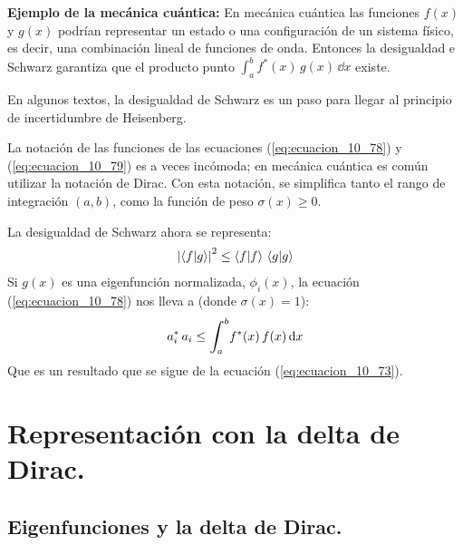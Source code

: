 \documentclass[12pt]{article}
\def\scaleint#1{\vcenter{\hbox{\scaleto[3ex]{\displaystyle\int}{#1}}}}
\def\bs{\mkern-12mu}
\numberwithin{equation}{section}
\begin{document}
\textbf{Ejemplo de la mecánica cuántica: } En mecánica cuántica las funciones $f (x)$ y $g (x)$ podrían representar un estado o una configuración de un sistema físico, es decir, una combinación lineal de funciones de onda. Entonces la desigualdad e Schwarz garantiza que el producto punto $\displaystyle \int_{a}^{b} f^{*} (x) \, g(x) \, \dd{x}$ existe.
\par
En algunos textos, la desigualdad de Schwarz es un paso para llegar al principio de incertidumbre de Heisenberg.
\par
La notación de las funciones de las ecuaciones (\ref{eq:ecuacion_10_78}) y (\ref{eq:ecuacion_10_79}) es a veces incómoda;  en mecánica cuántica es común utilizar la notación de Dirac. Con esta notación, se simplifica tanto el rango de integración $(a, b)$, como la función de peso $\sigma (x) \geq 0$. 
\par
La desigualdad de Schwarz ahora se representa:
\begin{align}
\abs{\braket{f}{g}}^{2} \leq \braket{f}{f} \, \braket{g}{g}
\label{eq:ecuacion_10_78a}
\end{align}
Si $g (x)$ es una eigenfunción normalizada, $\phi_{i} (x)$, la ecuación (\ref{eq:ecuacion_10_78}) nos lleva a (donde $\sigma (x) = 1$):
\begin{align}
a_{i}^{*} \, a_{i} \leq \scaleint{6ex}_{\bs a}^{b} f^{*} (x) \, f (x) \dd{x} 
\label{eq:ecuacion_10_81}
\end{align}
Que es un resultado que se sigue de la ecuación (\ref{eq:ecuacion_10_73}).


\section{Representación con la delta de Dirac.}
\subsection{Eigenfunciones y la delta de Dirac.}
\end{document}
